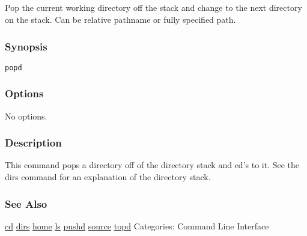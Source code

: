 \subsection{}
\label{popd}
Pop the current working directory off the stack and change to the next directory on the stack. Can be relative pathname or fully specified path. 
\subsubsection*{Synopsis}
\begin{verbatim}
popd
\end{verbatim}
\subsubsection*{Options}
 No options. 
\subsubsection*{Description}
 This command pops a directory off of the directory stack and cd's to it. See the dirs command for an explanation of the directory stack. 
\subsubsection*{See Also}
\hyperref[cd]{cd} \hyperref[dirs]{dirs} \hyperref[home]{home} \hyperref[ls]{ls} \hyperref[pushd]{pushd} \hyperref[source]{source} \hyperref[topd]{topd}  Categories: Command Line Interface
